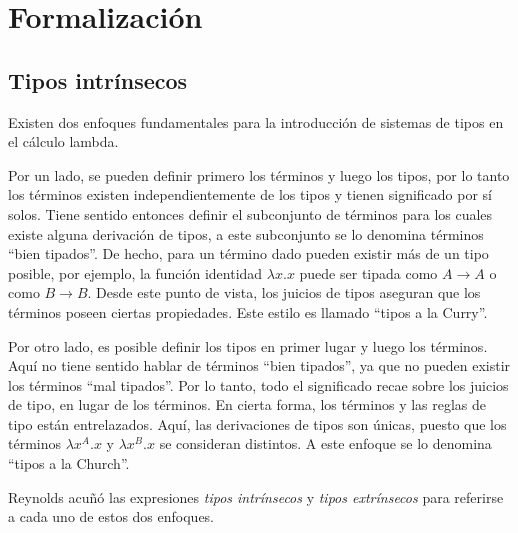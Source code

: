 \newcommand{\const}[1]{\AgdaInductiveConstructor{#1}}
\newcommand{\bound}[1]{\AgdaBound{#1}}
\newcommand{\func}[1]{\AgdaFunction{#1}}
\newcommand{\type}[1]{\AgdaDatatype{#1}}
\newcommand{\snstar}{\type{SN*} \func{⟦\_⟧} }
\newcommand{\cand}[1]{\func{⟦}#1\func{⟧}}

\newcommand{\parens}[1]{\AgdaSymbol{(}#1\AgdaSymbol{)}}
\newcommand{\subst}[2]{\func{⟪}\AgdaSpace{}#1\AgdaSpace{}\func{⟫}\AgdaSpace{}#2}
\newcommand{\cons}[2]{#1 \func{•} #2}
\newcommand{\ids}{\func{ids}}
\newcommand{\comp}[2]{#1 \func{∘} #2}


\section{Formalización}

\subsection{Tipos intrínsecos}

Existen dos enfoques fundamentales para la introducción de sistemas de tipos en el cálculo lambda.

Por un lado, se pueden definir primero los términos y luego los tipos, por lo tanto los términos existen independientemente de los tipos y tienen significado por sí solos.
Tiene sentido entonces definir el subconjunto de términos para los cuales existe alguna derivación de tipos, a este subconjunto se lo denomina términos ``bien tipados''.
De hecho, para un término dado pueden existir más de un tipo posible, por ejemplo, la función identidad $\lambda x.x$ puede ser tipada como $A \rightarrow A$ o como $B \rightarrow B$.
Desde este punto de vista, los juicios de tipos aseguran que los términos poseen ciertas propiedades.
Este estilo es llamado ``tipos a la Curry''.

Por otro lado, es posible definir los tipos en primer lugar y luego los términos.
Aquí no tiene sentido hablar de términos ``bien tipados'', ya que no pueden existir los términos ``mal tipados''.
Por lo tanto, todo el significado recae sobre los juicios de tipo, en lugar de los términos.
En cierta forma, los términos y las reglas de tipo están entrelazados.
Aquí, las derivaciones de tipos son únicas, puesto que los términos $\lambda x^A.x$ y $\lambda x^B.x$ se consideran distintos.
A este enfoque se lo denomina ``tipos a la Church''.

Reynolds \cite{reynolds_1998} acuñó las expresiones \textit{tipos intrínsecos} y \textit{tipos extrínsecos} para referirse a cada uno de estos dos enfoques.

